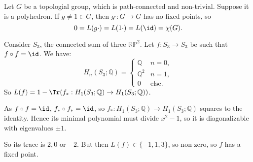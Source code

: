 \documentclass[12pt]{article}
\begin{document}
\begin{exbox}
	Let $G$ be a topologial group, which is path-connected and non-trivial. Suppose it is a polyhedron. If $g \neq 1 \in G$, then $g \cdot : G \to G$ has no fixed points, so
	\[
	0 = L(g \cdot) = L(1 \cdot) = L(\id) = \chi(G).
	\]
\end{exbox}

\begin{exbox}
	Consider $S_3$, the connected sum of three $\mathbb{RP}^2$. Let $f : S_3 \to S_3$ be such that $f \circ f = \id$. We have:
	\[
	H_n(S_3; \mathbb{Q}) =
	\begin{cases}
		\mathbb{Q} & n = 0,\\
		\mathbb{Q}^2 & n = 1,\\
		0 & \text{else}.
	\end{cases}
	\]
	So $L(f) = 1 - \Tr(f_\ast : H_1(S_3; \mathbb{Q}) \to H_1(S_3; \mathbb{Q}))$.

	As $f \circ f = \id$, $f_\ast \circ f_\ast = \id$, so $f_\ast : H_1(S_3; \mathbb{Q}) \to H_1(S_3; \mathbb{Q})$ squares to the identity. Hence its minimal polynomial must divide $x^2 - 1$, so it is diagonalizable with eigenvalues $\pm 1$.

	So its trace is $2, 0$ or $-2$. But then $L(f) \in \{-1, 1, 3\}$, so non-zero, so $f$ has a fixed point.
\end{exbox}


\newpage

\printindex
\end{document}
